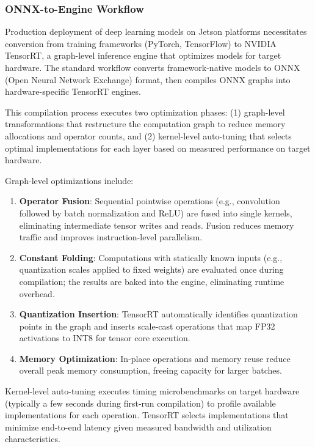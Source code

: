 \subsubsection{ONNX-to-Engine Workflow}

Production deployment of deep learning models on Jetson platforms necessitates conversion from training frameworks (PyTorch, TensorFlow) to NVIDIA TensorRT, a graph-level inference engine that optimizes models for target hardware. \cite{NVIDIA2024TensorRTModelOptimizer} The standard workflow converts framework-native models to ONNX (Open Neural Network Exchange) format, then compiles ONNX graphs into hardware-specific TensorRT engines.

This compilation process executes two optimization phases: (1) graph-level transformations that restructure the computation graph to reduce memory allocations and operator counts, and (2) kernel-level auto-tuning that selects optimal implementations for each layer based on measured performance on target hardware.

Graph-level optimizations include:
\begin{enumerate}
  \item \textbf{Operator Fusion}: Sequential pointwise operations (e.g., convolution followed by batch normalization and ReLU) are fused into single kernels, eliminating intermediate tensor writes and reads. Fusion reduces memory traffic and improves instruction-level parallelism.
  \item \textbf{Constant Folding}: Computations with statically known inputs (e.g., quantization scales applied to fixed weights) are evaluated once during compilation; the results are baked into the engine, eliminating runtime overhead.
  \item \textbf{Quantization Insertion}: TensorRT automatically identifies quantization points in the graph and inserts scale-cast operations that map FP32 activations to INT8 for tensor core execution.
  \item \textbf{Memory Optimization}: In-place operations and memory reuse reduce overall peak memory consumption, freeing capacity for larger batches.
\end{enumerate}

Kernel-level auto-tuning executes timing microbenchmarks on target hardware (typically a few seconds during first-run compilation) to profile available implementations for each operation. TensorRT selects implementations that minimize end-to-end latency given measured bandwidth and utilization characteristics.


